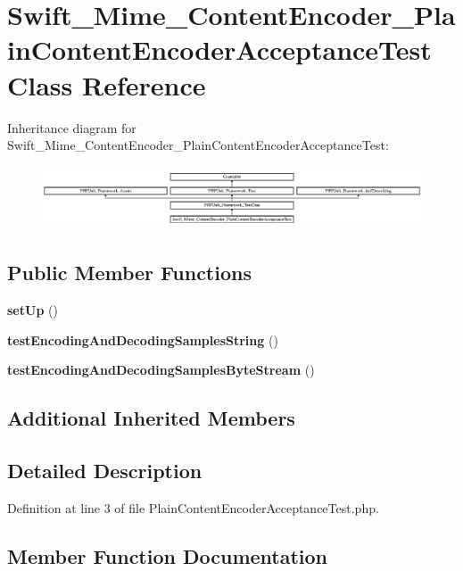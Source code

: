 \section{Swift\+\_\+\+Mime\+\_\+\+Content\+Encoder\+\_\+\+Plain\+Content\+Encoder\+Acceptance\+Test Class Reference}
\label{class_swift___mime___content_encoder___plain_content_encoder_acceptance_test}
Inheritance diagram for Swift\+\_\+\+Mime\+\_\+\+Content\+Encoder\+\_\+\+Plain\+Content\+Encoder\+Acceptance\+Test\+:\begin{figure}[H]
\begin{center}
\leavevmode
\includegraphics[height=1.871345cm]{class_swift___mime___content_encoder___plain_content_encoder_acceptance_test}
\end{center}
\end{figure}
\subsection*{Public Member Functions}
\begin{DoxyCompactItemize}
\item 
{\bf set\+Up} ()
\item 
{\bf test\+Encoding\+And\+Decoding\+Samples\+String} ()
\item 
{\bf test\+Encoding\+And\+Decoding\+Samples\+Byte\+Stream} ()
\end{DoxyCompactItemize}
\subsection*{Additional Inherited Members}


\subsection{Detailed Description}


Definition at line 3 of file Plain\+Content\+Encoder\+Acceptance\+Test.\+php.



\subsection{Member Function Documentation}
